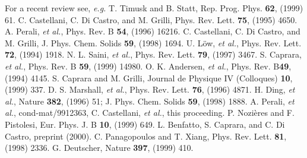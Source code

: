 \documentclass[twoside]{article}
\begin{document}
\begin{thebibliography}{9}

 For a recent review see, {\it e.g.} T. Timusk and
	  B. Statt, Rep. Prog. Phys. {\bf 62},  (1999) 61.
 C. Castellani, C. Di Castro, and M. Grilli,
	 Phys. Rev. Lett. {\bf 75}, (1995) 4650. 
 A. Perali, {\sl et al.},
	  Phys. Rev. B {\bf 54},  (1996) 16216.
 C. Castellani, C. Di Castro, and M. Grilli,
	J. Phys. Chem. Solids {\bf 59}, (1998) 1694.
 U. L\"ow, {\sl et al.}, Phys. Rev. Lett. {\bf 72}, (1994) 1918.
 N. L. Saini, {\sl et al.}, Phys. Rev. Lett. {\bf 79}, (1997)
                3467. 
 S. Caprara, {\sl et al.}, 
                  Phys. Rev. B {\bf 59}, (1999) 14980.
 O. K. Andersen, {\em et al.}, Phys. Rev. B{\bf  49}, 
	(1994) 4145.
 S. Caprara and M. Grilli,
	Journal de Physique IV (Colloques) {\bf 10}, (1999) 337.
 D. S. Marshall, {\em et al.}, Phys. Rev. Lett. {\bf 76}, 
	(1996) 4871.
 H. Ding, {\em et al.}, Nature {\bf 382}, (1996) 51; 
        J. Phys. Chem. Solids {\bf 59}, (1998) 1888.
 A. Perali, {\sl et al.}, cond-mat/9912363,
	C. Castellani, {\sl et al.}, this
	proceeding.
 P. Nozi\`eres and F. Pistolesi, Eur. Phys. J. B {\bf 10},
        (1999) 649.
 L. Benfatto, S. Caprara, and C. Di Castro, preprint (2000).
 C. Panagopoulos and T. Xiang, Phys. Rev. Lett. {\bf 81}, (1998) 
        2336.
 G. Deutscher, Nature {\bf 397}, (1999) 410.
\end{thebibliography}
\end{document}
